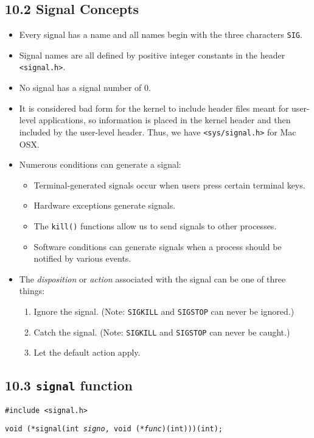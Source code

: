 \documentclass[]{article}
\newcommand{\code}{\texttt}
\begin{document}
\subsection*{10.2 Signal Concepts}
\begin{itemize}
\item Every signal has a name and all names begin with the three characters
\texttt{SIG}.
\item Signal names are all defined by positive integer constants in the header
\texttt{<signal.h>}.
\item No signal has a signal number of 0.
\item It is considered bad form for the kernel to include header files meant
for user-level applications, so information is placed in the kernel header and
then included by the user-level header. Thus, we have \code{<sys/signal.h>}
for Mac OSX.
\item Numerous conditions can generate a signal:
\begin{itemize}
\item Terminal-generated signals occur when users press certain terminal keys.
\item Hardware exceptions generate signals.
\item The \code{kill()} functions allow us to send signals to other processes.
\item Software conditions can generate signals when a process should be notified
by various events.
\end{itemize}
\item The \emph{disposition} or \emph{action} associated with the signal can be
one of three things:
\begin{enumerate}
\item Ignore the signal. (Note: \code{SIGKILL} and \code{SIGSTOP} can never
be ignored.)
\item Catch the signal. (Note: \code{SIGKILL} and \code{SIGSTOP} can never
be caught.)
\item Let the default action apply.
\end{enumerate}
\end{itemize}

\subsection*{10.3 \code{signal} function}
\texttt{\#include <signal.h>}

\texttt{void (*signal(int \emph{signo}, void (*\emph{func})(int)))(int);}
\end{document}
